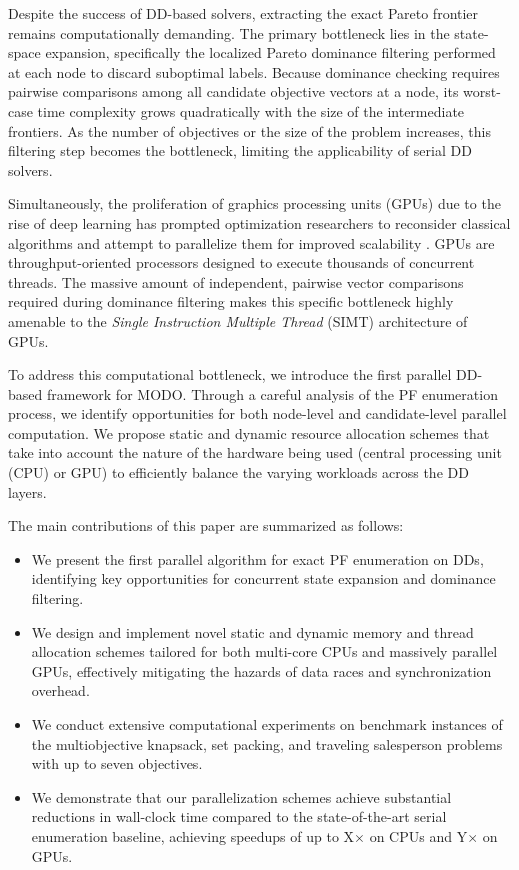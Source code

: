 \documentclass[letterpaper]{article}
\begin{document}
Despite the success of DD-based solvers, extracting the exact Pareto frontier remains computationally demanding. The primary bottleneck lies in the state-space expansion, specifically the localized Pareto dominance filtering performed at each node to discard suboptimal labels. Because dominance checking requires pairwise comparisons among all candidate objective vectors at a node, its worst-case time complexity grows quadratically with the size of the intermediate frontiers. As the number of objectives or the size of the problem increases, this filtering step becomes the bottleneck, limiting the applicability of serial DD solvers.

Simultaneously, the proliferation of graphics processing units (GPUs) due to the rise of deep learning has prompted optimization researchers to reconsider classical algorithms and attempt to parallelize them for improved scalability \cite{ben2019demystifying}. GPUs are throughput-oriented processors designed to execute thousands of concurrent threads. The massive amount of independent, pairwise vector comparisons required during dominance filtering makes this specific bottleneck highly amenable to the \emph{Single Instruction Multiple Thread} (SIMT) architecture of GPUs.

To address this computational bottleneck, we introduce the first parallel DD-based framework for MODO. Through a careful analysis of the PF enumeration process, we identify opportunities for both node-level and candidate-level parallel computation. We propose static and dynamic resource allocation schemes that take into account the nature of the hardware being used (central processing unit (CPU) or GPU) to efficiently balance the varying workloads across the DD layers.

The main contributions of this paper are summarized as follows:
\begin{itemize}
    \item We present the first parallel algorithm for exact PF enumeration on DDs, identifying key opportunities for concurrent state expansion and dominance filtering.
    \item We design and implement novel static and dynamic memory and thread allocation schemes tailored for both multi-core CPUs and massively parallel GPUs, effectively mitigating the hazards of data races and synchronization overhead.
    \item We conduct extensive computational experiments on benchmark instances of the multiobjective knapsack, set packing, and traveling salesperson problems with up to seven objectives.
    \item We demonstrate that our parallelization schemes achieve substantial reductions in wall-clock time compared to the state-of-the-art serial enumeration baseline, achieving speedups of up to X$\times$ on CPUs and Y$\times$ on GPUs.
\end{itemize}
\end{document}
